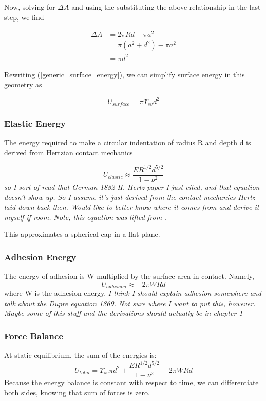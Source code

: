 Now, solving for $ \Delta A $ and using the substituting the above relationship in the last step, we find

\begin{align*}
\Delta A &= 2\pi Rd - \pi a^2 \\
&= \pi(a^2+d^2) - \pi a^2 \\
&= \pi d^2
\end{align*}
 
 Rewriting (\ref{generic_surface_energy}), we can simplify surface energy in this geometry as 
 
 \begin{equation}
 \label{surface_energy}
 U_{surface} = \pi \Upsilon_{sv} d^2
 \end{equation}



\subsubsection{Elastic Energy}
The energy required to make a circular indentation of radius R and depth d is derived from Hertzian contact mechanics \cite{hertz1882uber}

\begin{equation}
\label{elastic_energy}
U_{elastic} \approx  \frac{ER^{1/2}d^{5/2}}{1-\nu^2}
\end{equation}
\emph{so I sort of read that German 1882 H. Hertz paper I just cited, and that equation doesn't show up. So I assume it's just derived from the contact mechanics Hertz laid down back then. Would like to better know where it comes from and derive it myself if room. Note, this equation was lifted from \cite{style2013surface}}.

This approximates a spherical cap in a flat plane.
\subsubsection{Adhesion Energy}
The energy of adhesion is W multiplied by the surface area in contact. Namely,
\begin{equation}
\label{W_energy}
U_{adhesion} \approx -2\pi W R d 
\end{equation}
where W is the adhesion energy. \emph{I think I should explain adhesion somewhere and talk about the Dupre equation 1869. Not sure where I want to put this, however. Maybe some of this stuff and the derivations should actually be in chapter 1}

\subsubsection{Force Balance}
At static equilibrium, the sum of the energies is:
\[U_{total} = \Upsilon_{sv} \pi d^2 + \frac{ER^{1/2}d^{5/2}}{1-\nu^2} - 2\pi W R d\] 
Because the energy balance is constant with respect to time, we can differentiate both sides, knowing that sum of forces is zero.


